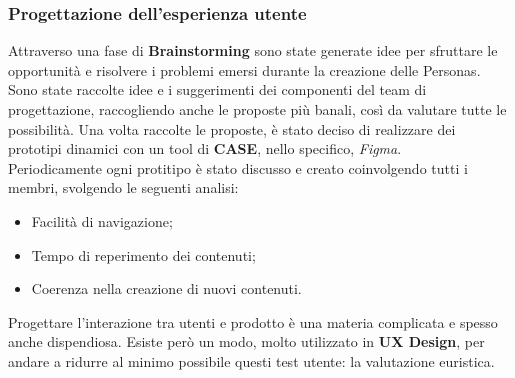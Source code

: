 \documentclass{natourDoc}
\begin{document}
\newpage


\subsubsection{Progettazione dell'esperienza utente}
Attraverso una fase di \textbf{Brainstorming} sono state generate idee per sfruttare le opportunità e risolvere i problemi emersi durante la creazione delle Personas.
Sono state raccolte idee e i suggerimenti dei componenti del team di progettazione, raccogliendo anche le proposte più banali, così da valutare tutte le possibilità.
Una volta raccolte le proposte, è stato deciso di realizzare dei prototipi dinamici con un tool di \textbf{CASE}, nello specifico, \textit{Figma}.\\

Periodicamente ogni protitipo è stato discusso e creato coinvolgendo tutti i membri, svolgendo le seguenti analisi:
\begin{itemize}
	\item Facilità di navigazione;
	\item Tempo di reperimento dei contenuti;
	\item Coerenza nella creazione di nuovi contenuti.
\end{itemize}

Progettare l'interazione tra utenti e prodotto è una materia complicata e spesso anche dispendiosa.
Esiste però un modo, molto utilizzato in \textbf{UX Design}, per andare a ridurre al minimo possibile questi test utente: la valutazione euristica. \\
\end{document}
